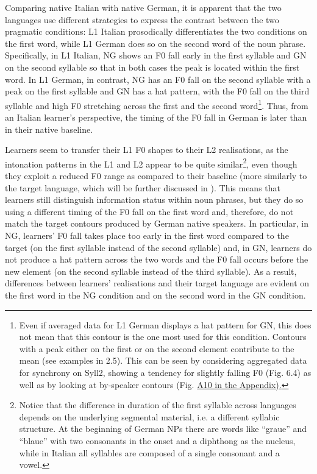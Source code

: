 Comparing native Italian with native German, it is apparent that the two languages use different strategies to express the contrast between the two pragmatic conditions: L1 Italian prosodically differentiates the two conditions on the first word, while L1 German does so on the second word of the noun phrase. Specifically, in L1 Italian, NG shows an F0 fall early in the first syllable and GN on the second syllable so that in both cases the peak is located within the first word. In L1 German, in contrast, NG has an F0 fall on the second syllable with a peak on the first syllable and GN has a hat pattern, with the F0 fall on the third syllable and high F0 stretching across the first and the second word\footnote{Even if averaged data for L1 German displays a hat pattern for GN, this does not mean that this contour is the one most used for this condition. Contours with a peak either on the first or on the second element contribute to the mean (see examples in 2.5). This can be seen by considering aggregated data for synchrony on Syll2, showing a tendency for slightly falling F0 (Fig. 6.4) as well as by looking at by-speaker contours (Fig. \hyperlink{bookmark210}{A10 in the Appendix).}}. Thus, from an Italian learner’s perspective, the timing of the F0 fall in German is later than in their native baseline.

Learners seem to transfer their L1 F0 shapes to their L2 realisations, as the intonation patterns in the L1 and L2 appear to be quite similar\footnote{Notice that the difference in duration of the first syllable across languages depends on the underlying segmental material, i.e. a different syllabic structure. At the beginning of German NPs there are words like “graue” and “blaue” with two consonants in the onset and a diphthong as the nucleus, while in Italian all syllables are composed of a single consonant and a vowel.}, even though they exploit a reduced F0 range as compared to their baseline (more similarly to the target language, which will be further discussed in ). This means that learners still distinguish information status within noun phrases, but they do so using a different timing of the F0 fall on the first word and, therefore, do not match the target contours produced by German native speakers. In particular, in NG, learners’ F0 fall takes place too early in the first word compared to the target (on the first syllable instead of the second syllable) and, in GN, learners do not produce a hat pattern across the two words and the F0 fall occurs before the new element (on the second syllable instead of the third syllable). As a result, differences between learners’ realisations and their target language are evident on the first word in the NG condition and on the second word in the GN condition.

